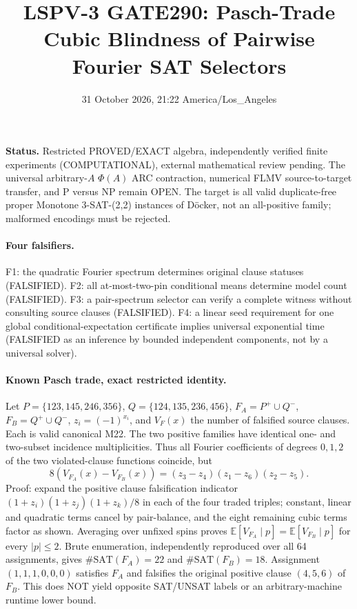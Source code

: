 \documentclass[11pt]{article}
\title{LSPV-3 GATE290: Pasch-Trade Cubic Blindness of Pairwise Fourier SAT Selectors}
\date{31 October 2026, 21:22 America/Los\_Angeles}
\begin{document}
\maketitle
\noindent\textbf{Status.} Restricted PROVED/EXACT algebra, independently verified finite experiments (COMPUTATIONAL), external mathematical review pending. The universal arbitrary-$A$ $\Phi(A)$ ARC contraction, numerical FLMV source-to-target transfer, and P versus NP remain OPEN. The target is all valid duplicate-free proper Monotone 3-SAT-(2,2) instances of D\"ocker, not an all-positive family; malformed encodings must be rejected.
\paragraph{Four falsifiers.} F1: the quadratic Fourier spectrum determines original clause statuses (FALSIFIED). F2: all at-most-two-pin conditional means determine model count (FALSIFIED). F3: a pair-spectrum selector can verify a complete witness without consulting source clauses (FALSIFIED). F4: a linear seed requirement for one global conditional-expectation certificate implies universal exponential time (FALSIFIED as an inference by bounded independent components, not by a universal solver).
\paragraph{Known Pasch trade, exact restricted identity.}
Let $P=\{123,145,246,356\}$, $Q=\{124,135,236,456\}$, $F_A=P^+\cup Q^-$, $F_B=Q^+\cup Q^-$, $z_i=(-1)^{x_i}$, and $V_F(x)$ the number of falsified source clauses. Each is valid canonical M22. The two positive families have identical one- and two-subset incidence multiplicities. Thus all Fourier coefficients of degrees $0,1,2$ of the two violated-clause functions coincide, but
\[
\boxed{8(V_{F_A}(x)-V_{F_B}(x))=(z_3-z_4)(z_1-z_6)(z_2-z_5).}
\]
Proof: expand the positive clause falsification indicator $(1+z_i)(1+z_j)(1+z_k)/8$ in each of the four traded triples; constant, linear and quadratic terms cancel by pair-balance, and the eight remaining cubic terms factor as shown. Averaging over unfixed spins proves $\mathbb E[V_{F_A}\mid p]=\mathbb E[V_{F_B}\mid p]$ for every $|p|\le2$. Brute enumeration, independently reproduced over all 64 assignments, gives $\#\mathrm{SAT}(F_A)=22$ and $\#\mathrm{SAT}(F_B)=18$. Assignment $(1,1,1,0,0,0)$ satisfies $F_A$ and falsifies the original positive clause $(4,5,6)$ of $F_B$. This does NOT yield opposite SAT/UNSAT labels or an arbitrary-machine runtime lower bound.
\end{document}
